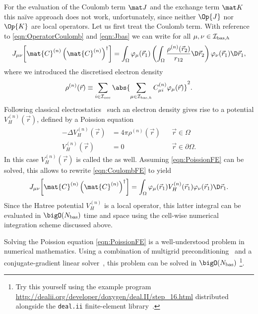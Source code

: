 For the evaluation of the Coulomb term $\matJ$
and the exchange term $\matK$ this na\"{i}ve approach does not work,
unfortunately, since neither $\Op{J}$ nor $\Op{K}$ are local operators.
Let us first treat the Coulomb term.
With reference to \eqref{eqn:OperatorCoulomb} and \eqref{eqn:Jbas}
we can write
for all $\mu, \nu \in \mathcal{I}_{\text{bas},h}$
\begin{equation}
	\label{eqn:CoulombFE}
	J_{\mu\nu}\!\left[\mat{C}^{(n)}
		\left(\mat{C}^{(n)}\right)^\dagger\right]
	= \int_\Omega \varphi_\mu(\vec{r}_1)
	\left(\int_\Omega \frac{\rho^{(n)}(\vec{r}_2)}
		{ r_{12} }\D \vec{r}_2 \right)
	\varphi_\nu(\vec{r}_1) \D \vec{r}_1,
\end{equation}
where we introduced the discretised electron density
\begin{equation}
	\rho^{(n)}(\vec{r}) \equiv \sum_{i\in\Iocc} \abs{\sum_{\mu\in\Ibash} C^{(n)}_{\mu i} \varphi_\mu(\vec{r})}^2.
	\label{eqn:ElectronDensityFE}
\end{equation}
Following classical electrostatics~\cite{Jackson1999}
such an electron density gives rise to a potential $V^{(n)}_H(\vec{r})$,
defined by a Poission equation
\begin{equation}
\label{eqn:PoissionFE}
\begin{aligned}
	-\Delta V^{(n)}_H(\vec{r}) &= 4\pi \rho^{(n)}(\vec{r}) &&\vec{r} \in \Omega \\
	V^{(n)}_H(\vec{r}) &= 0 && \vec{r} \in \partial\Omega.
\end{aligned}
\end{equation}
In this case $V^{(n)}_H(\vec{r})$ is called the  as well.
Assuming \eqref{eqn:PoissionFE} can be solved,
this allows to rewrite \eqref{eqn:CoulombFE} to yield
\[
	J_{\mu\nu}\!\left[\mat{C}^{(n)}\left(\mat{C}^{(n)}\right)^\dagger\right]
	= \int_\Omega \varphi_\mu(\vec{r}_1) V^{(n)}_H(\vec{r}_1) \varphi_\nu(\vec{r}_1) \D \vec{r}_1.
\]
Since the Hatree potential $V^{(n)}_H$ is a local operator,
this latter integral can be evaluated in $\bigO(\Nbas)$
time and space using the cell-wise numerical integration scheme discussed above.

Solving the Poission equation \eqref{eqn:PoissionFE}
is a well-understood problem in numerical mathematics.
Using a combination of multigrid preconditioning~\cite{Hackbusch1985}
and a conjugate-gradient linear solver~\cite{Grossmann1992},
this problem can be solved in $\bigO(\Nbas)$%
\footnote{Try this yourself using the
	example program \url{http://dealii.org/developer/doxygen/deal.II/step_16.html}
	distributed alongside
	the \texttt{deal.ii} finite-element library~\cite{Arndt2017,Bangerth2007}.
}.

